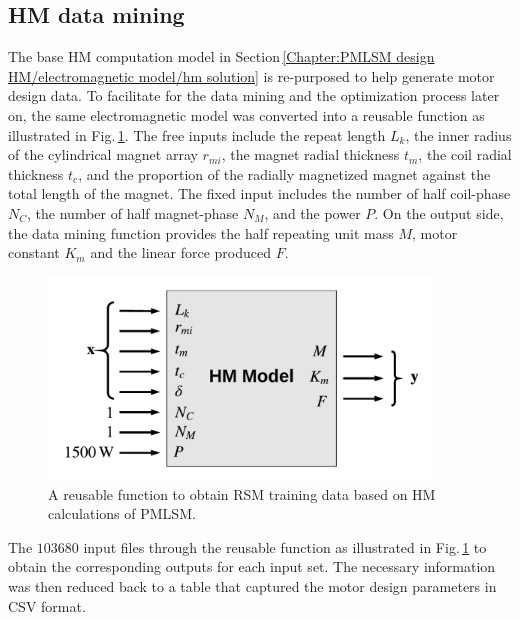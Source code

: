         \subsection{\acs{HM} data mining}           \label{Chapter:RSM/PMLSM/data mining}
        
        
            The base \acs{HM} computation model in Section\,\ref{Chapter:PMLSM design HM/electromagnetic model/hm solution} is re-purposed to help generate motor design data. To facilitate for the data mining and the optimization process later on, the same electromagnetic model was converted into a reusable function as illustrated in Fig.\,\ref{fig:chapter/rsm/PMLSM/mining process}. The free inputs include the repeat length $L_k$, the inner radius of the cylindrical magnet array $r_{mi}$, the magnet radial thickness $t_m$, the coil radial thickness $t_c$, and the proportion of the radially magnetized magnet against the total length of the magnet. The fixed input includes the number of half coil-phase $N_C$, the number of half magnet-phase $N_M$, and the power $P$. On the output side, the data mining function provides the half repeating unit mass $M$, motor constant $K_m$ and the linear force produced $F$.
        
        
            \begin{figure}
                \centering
                \includegraphics[width=4in]{chap4/images/HM_mining_for_PMLSM.pdf}
                \caption{A reusable function to obtain \acs{RSM} training data based on \ac{HM} calculations of \ac{PMLSM}.}
                \label{fig:chapter/rsm/PMLSM/mining process}
            \end{figure}
            
            
            The $103680$ input files through the reusable function as illustrated in Fig.\,\ref{fig:chapter/rsm/PMLSM/mining process} to obtain the corresponding outputs for each input set. The necessary information was then reduced back to a table that captured the motor design parameters in CSV format. 
            
